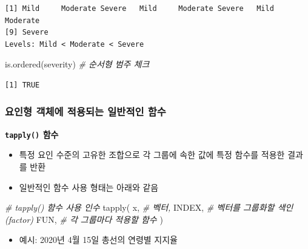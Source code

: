 \documentclass[
  11pt,
]{krantz}
\newenvironment{Shaded}{\begin{snugshade}}{\end{snugshade}}
\newcommand{\CommentTok}[1]{\textcolor[rgb]{0.37,0.37,0.37}{\textit{#1}}}
\newcommand{\FunctionTok}[1]{\textcolor[rgb]{0,0,0}{#1}}
\newcommand{\NormalTok}[1]{#1}
\providecommand{\tightlist}{%
  \setlength{\itemsep}{0pt}\setlength{\parskip}{0pt}}
\begin{document}
\begin{verbatim}
[1] Mild     Moderate Severe   Mild     Moderate Severe   Mild     Moderate
[9] Severe  
Levels: Mild < Moderate < Severe
\end{verbatim}

\begin{Shaded}
\begin{Highlighting}[]
\FunctionTok{is.ordered}\NormalTok{(severity) }\CommentTok{\# 순서형 범주 체크}
\end{Highlighting}
\end{Shaded}

\begin{verbatim}
[1] TRUE
\end{verbatim}

\normalsize

\hypertarget{factor-generic-fun}{%
\subsubsection*{요인형 객체에 적용되는 일반적인 함수}\label{factor-generic-fun}}


\textbf{\texttt{tapply()} 함수}

\begin{itemize}
\tightlist
\item
  특정 요인 수준의 고유한 조합으로 각 그룹에 속한 값에 특정 함수를 적용한 결과를 반환
\item
  일반적인 함수 사용 형태는 아래와 같음
\end{itemize}

\footnotesize

\begin{Shaded}
\begin{Highlighting}[]
\CommentTok{\# tapply() 함수 사용 인수}
\FunctionTok{tapply}\NormalTok{(}
\NormalTok{  x, }\CommentTok{\# 벡터, }
\NormalTok{  INDEX, }\CommentTok{\# 벡터를 그룹화할 색인(factor)}
\NormalTok{  FUN, }\CommentTok{\# 각 그룹마다 적용할 함수}
\NormalTok{)}
\end{Highlighting}
\end{Shaded}

\normalsize

\begin{itemize}
\tightlist
\item
  예시: 2020년 4월 15일 총선의 연령별 지지율
\end{itemize}

\footnotesize
\end{document}
